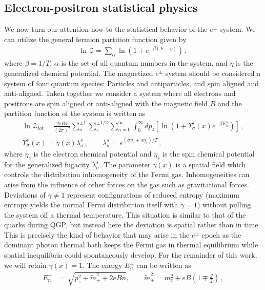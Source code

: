 \documentclass[universe,article,submit,moreauthors,pdftex,a4paper]{Definitions/mdpi}
\begin{document}
\subsection{Electron-positron statistical physics}\label{sec:Partition}
\noindent We now turn our attention now to the statistical behavior of the $e^{\pm}$ system. We can utilize the general fermion partition function given by~\cite{Elze:1980er}
\begin{align}
 \label{PartFunc} \ln\mathcal{Z}=\sum_{\alpha}\ln\left(1+e^{-\beta(E-\eta)}\right)\,,
\end{align}
where $\beta=1/T$, $\alpha$ is the set of all quantum numbers in the system, and $\eta$ is the generalized chemical potential. The magnetized $e^{\pm}$ system should be considered a system of four quantum species: Particles and antiparticles, and spin aligned and anti-aligned. Taken together we consider a system where all electrons and positrons are spin aligned or anti-aligned with the magnetic field $B$ and the partition function of the system is written as
\begin{align}
 \label{PartFuncB}\ln\mathcal{Z}_{tot}=\frac{2eBV}{(2\pi)^2}\sum_{\sigma}^{\pm1}\sum_{s}^{\pm1/2}\sum_{n=0}^\infty\int^\infty_{0}dp_z\left[\ln\left(1+\Upsilon_{\sigma}^{s}(x)e^{-\beta E_{n}^{s}}\right)\right]\,,\\
 \label{Fugacity}\Upsilon_{\sigma}^{s}(x)=\gamma(x)\lambda_{\sigma}^{s}\,,\qquad\lambda_{\sigma}^{s}=e^{(\sigma\eta_{e}+s\eta_{s})/T}\,,
\end{align}
where $\eta_{e}$ is the electron chemical potential and $\eta_s$ is the spin chemical potential for the generalized fugacity $\lambda_{\sigma}^{s}$. The parameter $\gamma(x)$ is a spatial field which controls the distribution inhomogeneity of the Fermi gas. Inhomogeneities can arise from the influence of other forces on the gas such as gravitational forces. Deviations of $\gamma\neq1$ represent configurations of reduced entropy (maximum entropy yields the normal Fermi distribution itself with $\gamma=1$) without pulling the system off a thermal temperature. This situation is similar to that of the quarks during QGP, but instead here the deviation is spatial rather than in time. This is precisely the kind of behavior that may arise in the $e^{\pm}$ epoch as the dominant photon thermal bath keeps the Fermi gas in thermal equilibrium while spatial inequilibria could spontaneously develop. For the remainder of this work, we will retain $\gamma(x)=1$. The energy $E_{n}^\pm$ can be written as
\begin{align}
E_{n}^\pm&=\sqrt{p^2_z+\tilde m^2_\pm+2eBn},\qquad\tilde{m}^2_\pm=m^2_e+eB\left(1\mp\frac{g}{2}\right)\,,
\end{align}
\end{document}
